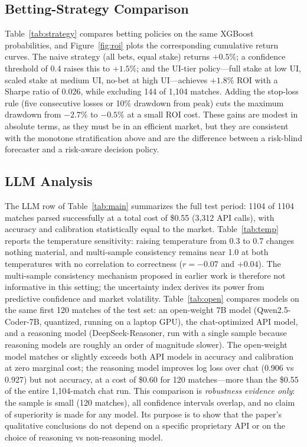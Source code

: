\subsection{Betting-Strategy Comparison}


Table~\ref{tab:strategy} compares betting policies on the same
XGBoost probabilities, and Figure~\ref{fig:roi} plots the
corresponding cumulative return curves. The naive strategy
(all bets, equal stake)
returns $+0.5\%$; a confidence threshold of 0.4 raises this to
$+1.5\%$; and the UI-tier policy---full stake at low UI, scaled stake
at medium UI, no-bet at high UI---achieves $+1.8\%$ ROI with a
Sharpe ratio of 0.026, while excluding 144 of 1,104 matches. Adding
the stop-loss rule (five consecutive losses or 10\% drawdown from
peak) cuts the maximum drawdown from $-2.7\%$ to $-0.5\%$ at a small
ROI cost. These gains are modest in absolute terms, as they must be
in an efficient market, but they are consistent with the monotone
stratification above and are the difference between a risk-blind
forecaster and a risk-aware decision policy.

\subsection{LLM Analysis}
\label{sec:llm_analysis}




The LLM row of Table~\ref{tab:main} summarizes the full test period:
1104 of 1104 matches parsed successfully at a total cost of \$0.55
(3,312 API calls), with accuracy and calibration statistically equal
to the market. Table~\ref{tab:temp} reports the
 temperature
sensitivity: raising temperature from 0.3 to 0.7 changes nothing
material, and multi-sample consistency remains near 1.0 at both
temperatures with no correlation to correctness ($r = -0.07$ and
$+0.04$). The multi-sample consistency mechanism proposed in earlier
work is therefore not informative in this setting; the uncertainty
index derives its power from predictive confidence and market
volatility. Table~\ref{tab:open} compares models on the same first
120 matches of the test set: an open-weight 7B model
(Qwen2.5-Coder-7B, quantized, running on a laptop GPU), the
chat-optimized API model, and a reasoning model (DeepSeek-Reasoner,
run with a single sample because reasoning models are roughly an
order of magnitude slower). The open-weight model matches or slightly
exceeds both API models in accuracy and calibration at zero marginal
cost; the reasoning model improves log loss over chat
(0.906 vs 0.927) but not accuracy, at a cost of \$0.60 for 120
matches---more than the \$0.55 of the entire 1,104-match chat
run. This comparison is \emph{robustness evidence only}: the sample
is small (120 matches), all confidence intervals overlap, and
no claim of superiority is made for any model. Its purpose is to
show that the paper's qualitative conclusions do not depend on a
specific proprietary API or on the choice of reasoning vs
non-reasoning model.

